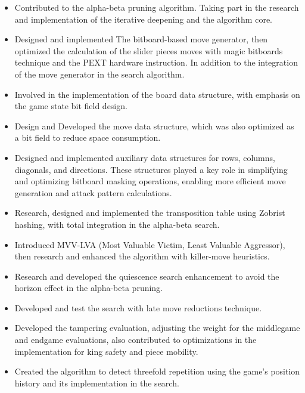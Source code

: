 \begin{itemize}

    \item Contributed to the alpha-beta pruning algorithm. Taking part in the research and implementation of the iterative deepening and the algorithm core.

    \item Designed and implemented The bitboard-based move generator, then optimized the calculation of the slider pieces moves with magic bitboards technique and the PEXT hardware instruction. In addition to the integration of the move generator in the search algorithm.

    \item Involved in the implementation of the board data structure, with emphasis on the game state bit field design.

    \item Design and Developed the move data structure, which was also optimized as a bit field to reduce space consumption.    

    \item Designed and implemented auxiliary data structures for rows, columns, diagonals, and directions. These structures played a key role in simplifying and optimizing bitboard masking operations, enabling more efficient move generation and attack pattern calculations.
    
    \item Research, designed and implemented the transposition table using Zobrist hashing, with total integration in the alpha-beta search.

    \item Introduced MVV-LVA (Most Valuable Victim, Least Valuable Aggressor), then research and enhanced the algorithm with killer-move heuristics.

    \item Research and developed the quiescence search enhancement to avoid the horizon effect in the alpha-beta pruning.

    \item Developed and test the search with late move reductions technique.

    \item Developed the tampering evaluation, adjusting the weight for the middlegame and endgame evaluations, also contributed to optimizations in the implementation for king safety and piece mobility.

    \item Created the algorithm to detect threefold repetition using the game's position history and its implementation in the search.


\end{itemize}
